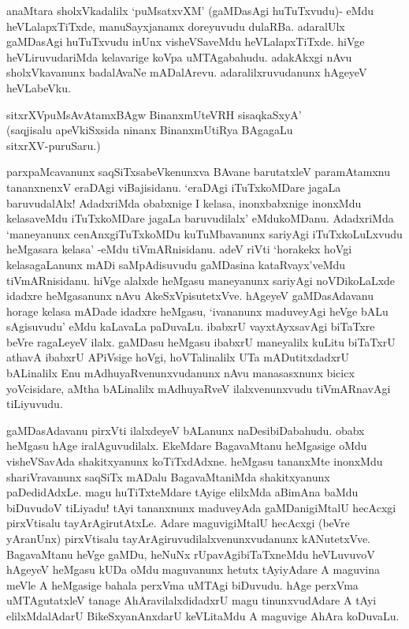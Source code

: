 anaMtara sholxVkadalilx `puMsatxvXM' (gaMDasAgi huTuTxvudu)- eMdu heVLalapxTiTxde, manuSayxjanamx doreyuvudu dulaRBa. adaralUlx gaMDasAgi huTuTxvudu inUnx visheVSaveMdu heVLalapxTiTxde. hiVge heVLiruvudariMda kelavarige koVpa uMTAgabahudu. adakAkxgi nAvu sholxVkavanunx badalAvaNe mADalArevu. adaralilxruvudanunx hAgeyeV heVLabeVku.

\begin{shloka}
sitxrXVpuMsAvAtamxBAgw BinanxmUteVRH sisaqkaSxyA'\\
(saqjisalu apeVkiSxsida ninanx BinanxmUtiRya BAgagaLu\\
sitxrXV-puruSaru.)
\end{shloka}

parxpaMcavanunx saqSiTxsabeVkenunxva BAvane barutatxleV paramAtamxnu tananxnenxV eraDAgi viBajisidanu. `eraDAgi iTuTxkoMDare jagaLa baruvudalAlx! AdadxriMda obabxnige I kelasa, inonxbabxnige inonxMdu kelasaveMdu iTuTxkoMDare jagaLa baruvudilalx' eMdukoMDanu. AdadxriMda `maneyanunx cenAnxgiTuTxkoMDu kuTuMbavanunx sariyAgi iTuTxkoLuLxvudu heMgasara kelasa' -eMdu tiVmARnisidanu. adeV riVti `horakekx hoVgi kelasagaLanunx mADi saMpAdisuvudu gaMDasina kataRvayx'veMdu tiVmARnisidanu. hiVge alalxde heMgasu maneyanunx sariyAgi noVDikoLaLxde idadxre heMgasanunx nAvu AkeSxVpisutetxVve. hAgeyeV gaMDasAdavanu horage kelasa mADade idadxre heMgasu, `ivananunx maduveyAgi heVge bALu sAgisuvudu' eMdu kaLavaLa paDuvaLu. ibabxrU vayxtAyxsavAgi biTaTxre beVre ragaLeyeV ilalx. gaMDasu heMgasu ibabxrU maneyalilx kuLitu biTaTxrU athavA ibabxrU APiVsige hoVgi, hoVTalinalilx UTa mADutitxdadxrU bALinalilx Enu mAdhuyaRvenunxvudanunx nAvu manasasxnunx bicicx yoVcisidare, aMtha bALinalilx mAdhuyaRveV ilalxvenunxvudu tiVmARnavAgi tiLiyuvudu.

gaMDasAdavanu pirxVti ilalxdeyeV bALanunx naDesibiDabahudu. obabx heMgasu hAge iralAguvudilalx. EkeMdare BagavaMtanu heMgasige oMdu visheVSavAda shakitxyanunx koTiTxdAdxne. heMgasu tananxMte inonxMdu shariVravanunx saqSiTx mADalu BagavaMtaniMda shakitxyanunx paDedidAdxLe. magu huTiTxteMdare tAyige elilxMda aBimAna baMdu biDuvudoV tiLiyadu! tAyi tananxnunx maduveyAda gaMDanigiMtalU hecAcxgi pirxVtisalu tayArAgirutAtxLe. Adare maguvigiMtalU hecAcxgi (beVre yAranUnx) pirxVtisalu tayArAgiruvudilalxvenunxvudanunx kANutetxVve. BagavaMtanu heVge gaMDu, heNuNx rUpavAgibiTaTxneMdu heVLuvuvoV hAgeyeV heMgasu kUDa oMdu maguvanunx hetutx tAyiyAdare A maguvina meVle A heMgasige bahala perxVma uMTAgi biDuvudu. hAge perxVma uMTAgutatxleV tanage AhAravilalxdidadxrU magu tinunxvudAdare A tAyi elilxMdalAdarU BikeSxyanAnxdarU keVLitaMdu A maguvige AhAra koDuvaLu.

